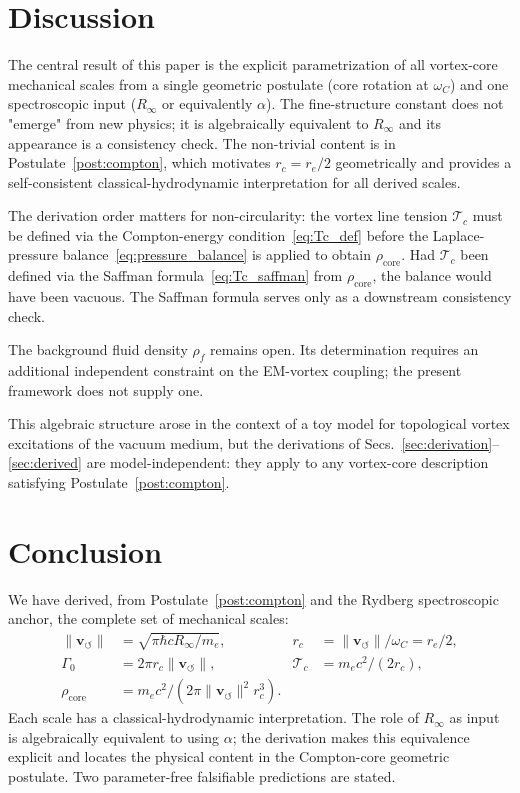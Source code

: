 \documentclass[aps,pra,preprint,longbibliography,nofootinbib]{revtex4-2}
\newcommand{\vnorm}{\lVert\mathbf{v}_{\!\boldsymbol{\circlearrowleft}}\rVert} %
\newcommand{\rhof}{\rho_{\!f}}                   %
\newcommand{\rhocore}{\rho_{\mathrm{core}}}      %
\newcommand{\rc}{r_c}                            %
\newcommand{\omC}{\omega_C}                      %
\newcommand{\Rinf}{R_\infty}                     %
\newcommand{\Tc}{\mathcal{T}_c}                  %
\newcommand{\Gz}{\Gamma_0}                       %
\begin{document}
\section{Discussion}
\label{sec:discussion}

The central result of this paper is the explicit parametrization of
all vortex-core mechanical scales from a single geometric postulate
(core rotation at $\omC$) and one spectroscopic input ($\Rinf$
or equivalently $\alpha$).
The fine-structure constant does not "emerge" from new physics; it
is algebraically equivalent to $\Rinf$ and its appearance is a
consistency check.
The non-trivial content is in Postulate~\ref{post:compton}, which
motivates $\rc = r_e/2$ geometrically and provides a self-consistent
classical-hydrodynamic interpretation for all derived scales.

The derivation order matters for non-circularity: the vortex line
tension $\Tc$ must be defined via the Compton-energy
condition~\eqref{eq:Tc_def} before the Laplace-pressure
balance~\eqref{eq:pressure_balance} is applied to obtain
$\rhocore$.
Had $\Tc$ been defined via the Saffman formula~\eqref{eq:Tc_saffman}
from $\rhocore$, the balance would have been vacuous.
The Saffman formula serves only as a downstream consistency check.

The background fluid density $\rhof$ remains open.
Its determination requires an additional independent constraint on
the EM-vortex coupling; the present framework does not supply one.

This algebraic structure arose in the context of a toy model for
topological vortex excitations of the vacuum medium, but the
derivations of Secs.~\ref{sec:derivation}--\ref{sec:derived} are
model-independent: they apply to any vortex-core description
satisfying Postulate~\ref{post:compton}.

\section{Conclusion}
\label{sec:conclusion}

We have derived, from Postulate~\ref{post:compton} and the Rydberg
spectroscopic anchor, the complete set of mechanical scales:
\begin{align*}
  \vnorm  &= \sqrt{\pi\hbar c\Rinf/m_e},
  &\rc    &= \vnorm/\omC = r_e/2, \\
  \Gz     &= 2\pi\rc\vnorm,
  &\Tc    &= m_ec^2/(2\rc),\\
  \rhocore &= m_ec^2/(2\pi\vnorm^2\rc^3).
\end{align*}
Each scale has a classical-hydrodynamic interpretation.
The role of $\Rinf$ as input is algebraically equivalent to using
$\alpha$; the derivation makes this equivalence explicit and locates
the physical content in the Compton-core geometric postulate.
Two parameter-free falsifiable predictions are stated.
\end{document}
